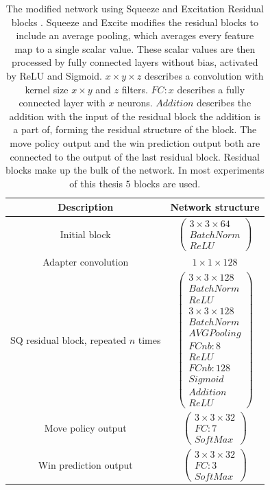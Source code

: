 \documentclass[12pt,onecolumn,oneside,titlepage]{article}
\begin{document}
\begin{table} [H]
 \centering
  \begin{tabular}{c | c }
   Description & Network structure \\
   \hline
   \hline
   Initial block & $\begin{pmatrix} 3 \times 3 \times 64 \\ BatchNorm \\ ReLU \end{pmatrix}$ \\
   \hline
   Adapter convolution & $1 \times 1 \times 128$ \\
   \hline
   SQ residual block, repeated $n$ times & $\begin{pmatrix} 3 \times 3 \times 128 \\ BatchNorm \\ ReLU \\ 3 \times 3 \times 128 \\ BatchNorm \\ AVG Pooling \\ FCnb: 8 \\ ReLU \\ FCnb: 128 \\ Sigmoid \\ Addition \\ ReLU \end{pmatrix}$ \\
   \hline 
   Move policy output & $\begin{pmatrix} 3 \times 3 \times 32 \\ FC: 7 \\ SoftMax \end{pmatrix}$ \\
   \hline
   Win prediction output & $\begin{pmatrix} 3 \times 3 \times 32 \\ FC: 3 \\ SoftMax \end{pmatrix}$
  \end{tabular}
  \caption{The modified network using Squeeze and Excitation Residual blocks \cite{hu2018squeeze}.
  Squeeze and Excite modifies the residual blocks to include an average pooling, which averages every feature map to a single scalar value. These scalar values are then processed by fully connected layers without bias, activated by ReLU and Sigmoid.
  $x \times y \times z$ describes a convolution with kernel size $x \times y$ and $z$ filters. $FC: x$ describes a fully connected layer with $x$ neurons. $Addition$ describes the addition with the input of the residual block the addition is a part of, forming the residual structure of the block.
  The move policy output and the win prediction output both are connected 
  to the output of the last residual block. Residual blocks make up the bulk of the network. In most experiments of this thesis $5$ blocks are used.}
  \label{fig:sq_blocks_network}
\end{table}
\end{document}
